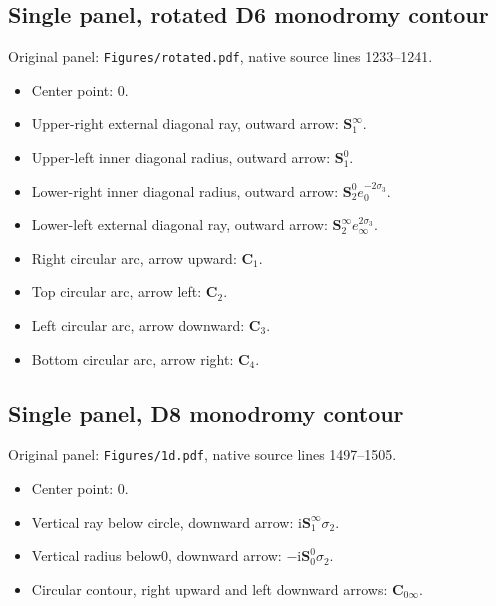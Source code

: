 \documentclass[11pt]{article}
\numberwithin{equation}{section}
\numberwithin{equation}{section}
\begin{document}
\subsection*{Single panel, rotated D6 monodromy contour}
\noindent Original panel: \texttt{Figures/rotated.pdf}, native source lines 1233--1241.
\begin{itemize}\itemsep=0pt
\item Center point: $0$.
\item Upper-right external diagonal ray, outward arrow: $\mathbf{S}_1^\infty{}$.
\item Upper-left inner diagonal radius, outward arrow: $\mathbf{S}_1^0{}$.
\item Lower-right inner diagonal radius, outward arrow: $\mathbf{S}_2^0{}e_0^{-2\sigma_3}$.
\item Lower-left external diagonal ray, outward arrow: $\mathbf{S}_2^\infty{}e_\infty^{2\sigma_3}$.
\item Right circular arc, arrow upward: $\mathbf{C}_1{}$.
\item Top circular arc, arrow left: $\mathbf{C}_2{}$.
\item Left circular arc, arrow downward: $\mathbf{C}_3{}$.
\item Bottom circular arc, arrow right: $\mathbf{C}_4{}$.
\end{itemize}

\subsection*{Single panel, D8 monodromy contour}
\noindent Original panel: \texttt{Figures/1d.pdf}, native source lines 1497--1505.
\begin{itemize}\itemsep=0pt
\item Center point: $0$.
\item Vertical ray below circle, downward arrow: $\mathrm{i}\mathbf{S}_1^\infty{}\sigma_2$.
\item Vertical radius below0, downward arrow: $-\mathrm{i}\mathbf{S}_0^0{}\sigma_2$.
\item Circular contour, right upward and left downward arrows: $\mathbf{C}_{0\infty}{}$.
\end{itemize}
\end{document}
